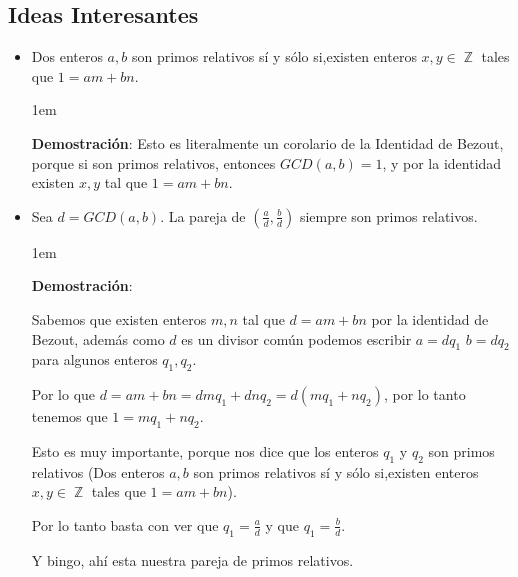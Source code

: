 \documentclass[12pt, fleqn]{report}                             %
\newenvironment{SmallIndentation}[1][0.75em]                    %
    {\begin{adjustwidth}{#1}{}\begin{footnotesize}}                 %
    {\end{footnotesize}\end{adjustwidth}}                           %
\DeclareMathOperator \Integers  {\mathbb{Z}}                     %
\begin{document}
        \subsection*{Ideas Interesantes}
            \begin{itemize}

                \item Dos enteros $a,b$ son primos relativos sí y sólo si,existen
                enteros $x,y \in \Integers$ tales que $1=am+bn$.

                    \begin{SmallIndentation}[1em]
                        \textbf{Demostración}:
                            Esto es literalmente un corolario de la Identidad de Bezout,
                            porque si son primos relativos, entonces $GCD(a,b)=1$, y por 
                            la identidad existen $x,y$ tal que $1=am+bn$.

                    \end{SmallIndentation} 


                \item Sea $d=GCD(a,b)$. La pareja de $(\frac{a}{d}, \frac{b}{d})$ siempre son
                primos relativos.

                    \begin{SmallIndentation}[1em]
                        \textbf{Demostración}:

                        Sabemos que existen enteros $m,n$ tal que $d = am+bn$ por la
                        identidad de Bezout, además como $d$ es un divisor común
                        podemos escribir $a=dq_1$ $b=dq_2$ para algunos enteros $q_1,q_2$.

                        Por lo que $d=am+bn = dmq_1 + dnq_2 = d(mq_1 +nq_2)$, por
                        lo tanto tenemos que $1= mq_1 + nq_2$.

                        Esto es muy importante, porque nos dice que los enteros $q_1$ y $q_2$
                        son primos relativos (Dos enteros $a,b$ son primos relativos sí y sólo
                        si,existen enteros $x,y \in \Integers$ tales que $1=am+bn$).

                        Por lo tanto basta con ver que $q_1=\frac{a}{d}$ y que $q_1=\frac{b}{d}$.

                        Y bingo, ahí esta nuestra pareja de primos relativos.


\end{SmallIndentation}
\end{itemize}
\end{document}
